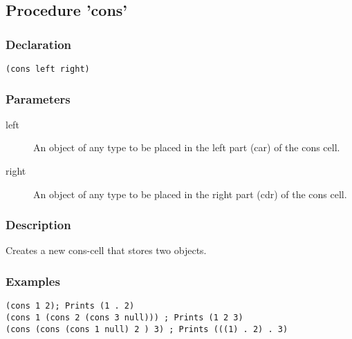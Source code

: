 \subsection{Procedure 'cons'}
\label{builtins/cons}

\subsubsection*{Declaration}
\begin{lstlisting}
(cons left right)
\end{lstlisting}

\subsubsection*{Parameters}
\begin{description}
	\item[left] An object of any type to be placed in the left part (car) of the cons cell.
	\item[right] An object of any type to be placed in the right part (cdr) of the cons cell.
\end{description}

\subsubsection*{Description}
Creates a new cons-cell that stores two \lisp{} objects.

\subsubsection*{Examples}
\begin{lstlisting}
(cons 1 2); Prints (1 . 2)
(cons 1 (cons 2 (cons 3 null))) ; Prints (1 2 3)
(cons (cons (cons 1 null) 2 ) 3) ; Prints (((1) . 2) . 3)
\end{lstlisting}
